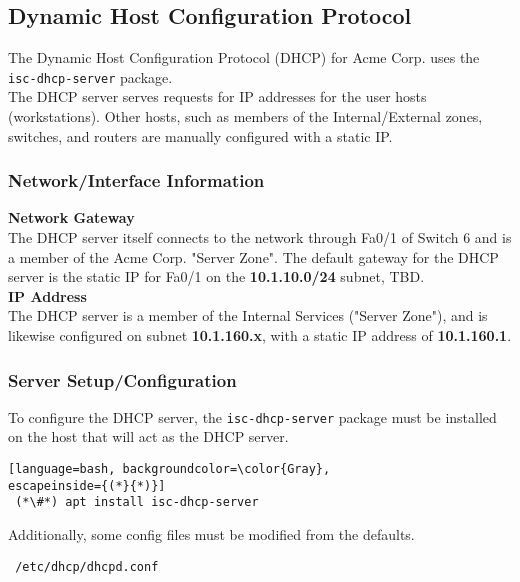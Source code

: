 \subsection{Dynamic Host Configuration Protocol}
The Dynamic Host Configuration Protocol (DHCP) for Acme Corp. uses the 
\lstinline$isc-dhcp-server$ package. \\

\noindent
The DHCP server serves requests for IP addresses for the user hosts 
(workstations). Other hosts, such as members of the Internal/External zones,
switches, and routers are manually configured with a static IP.

\subsubsection{Network/Interface Information}
\textbf{Network Gateway} \\
The DHCP server itself connects to the network through Fa0/1 of Switch 6 and is 
a member of the Acme Corp. "Server Zone". The default gateway for the DHCP 
server is the static IP for Fa0/1 on the \textbf{10.1.10.0/24} subnet, TBD. \\

\noindent
\textbf{IP Address} \\
The DHCP server is a member of the Internal Services ("Server Zone"), and is
likewise configured on subnet \textbf{10.1.160.x}, with a static IP address of 
\textbf{10.1.160.1}. \\

\subsubsection{Server Setup/Configuration}
To configure the DHCP server, the \lstinline$isc-dhcp-server$ package must be 
installed on the host that will act as the DHCP server. \\

\begin{lstlisting}[language=bash, backgroundcolor=\color{Gray}, 
escapeinside={(*}{*)}]
 (*\#*) apt install isc-dhcp-server
\end{lstlisting}
\vspace{1em}

\noindent
Additionally, some config files must be modified from the defaults. \\

\begin{lstlisting}
 /etc/dhcp/dhcpd.conf
\end{lstlisting}
\vspace{1em}

